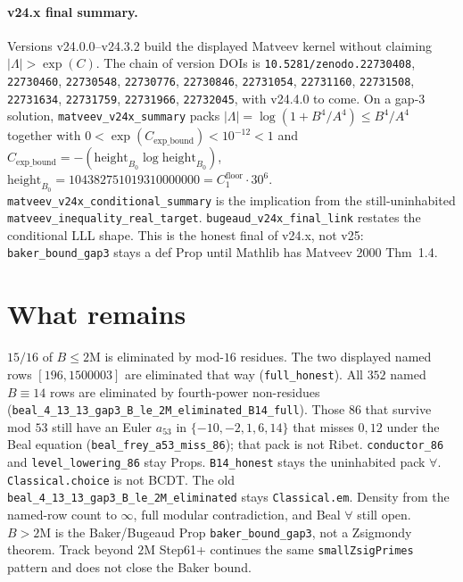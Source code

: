 \documentclass[12pt]{amsart}
\begin{document}
\paragraph{v24.x final summary.}
Versions v24.0.0--v24.3.2 build the displayed
Matveev kernel without claiming
$|\Lambda|>\exp(C)$.
The chain of version DOIs is
\texttt{10.5281/zenodo.22730408},
\texttt{22730460},
\texttt{22730548},
\texttt{22730776},
\texttt{22730846},
\texttt{22731054},
\texttt{22731160},
\texttt{22731508},
\texttt{22731634},
\texttt{22731759},
\texttt{22731966},
\texttt{22732045},
with v24.4.0 to come.
On a gap-3 solution,
\texttt{matveev\_v24x\_summary}
packs
$|\Lambda|=\log(1+B^4/A^4)\le B^4/A^4$
together with
$0<\exp(C_{\mathrm{exp\_bound}})<10^{-12}<1$
and
$C_{\mathrm{exp\_bound}}=-(\mathrm{height}_{B_0}\log\mathrm{height}_{B_0})$,
$\mathrm{height}_{B_0}=104382751019310000000=C_1^{\mathrm{floor}}\cdot 30^6$.
\texttt{matveev\_v24x\_conditional\_summary}
is the implication from the still-uninhabited
\texttt{matveev\_inequality\_real\_target}.
\texttt{bugeaud\_v24x\_final\_link}
restates the conditional LLL shape.
This is the honest final of v24.x, not v25:
\texttt{baker\_bound\_gap3} stays a def Prop
until Mathlib has Matveev 2000 Thm~1.4.

\section{What remains}
$15/16$ of $B\le 2\text{M}$ is eliminated by mod-$16$ residues.
The two displayed named rows $[196,1500003]$ are
eliminated that way (\texttt{full\_honest}).
All $352$ named $B\equiv 14$ rows are eliminated by
fourth-power non-residues
(\texttt{beal\_4\_13\_13\_gap3\_B\_le\_2M\_eliminated\_B14\_full}).
Those $86$ that survive mod $53$ still have an Euler
$a_{53}$ in $\{-10,-2,1,6,14\}$ that misses $0,12$
under the Beal equation
(\texttt{beal\_frey\_a53\_miss\_86});
that pack is not Ribet.
\texttt{conductor\_86} and
\texttt{level\_lowering\_86} stay Props.
\texttt{B14\_honest} stays the uninhabited pack
$\forall$.
\texttt{Classical.choice} is not BCDT.
The old \texttt{beal\_4\_13\_13\_gap3\_B\_le\_2M\_eliminated}
stays \texttt{Classical.em}.
Density from the named-row count to $\infty$,
full modular contradiction, and Beal $\forall$
still open.
$B>2\mathrm{M}$ is the Baker/Bugeaud Prop
\texttt{baker\_bound\_gap3}, not a Zsigmondy theorem.
Track beyond $2\text{M}$ Step61+ continues the same
\texttt{smallZsigPrimes} pattern and does not close
the Baker bound.
\end{document}
